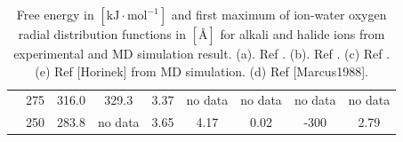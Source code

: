 \begin{table}[h]
\begin{centering}
\begin{tabular*}{1\linewidth}{@{\extracolsep{\fill}}ccccccccc}
\addlinespace[-0.33em]
{\scriptsize{}$\mathrm{Rb^{+}}$ } & {\scriptsize{}275} & {\scriptsize{}316.0} & {\scriptsize{}329.3} & {\scriptsize{}3.37} & {\scriptsize{}no data} & {\scriptsize{}no data} & {\scriptsize{}no data} & {\scriptsize{}no data}\tabularnewline
\addlinespace[-0.33em]
{\scriptsize{}$\mathrm{Cs^{+}}$ } & {\scriptsize{}250} & {\scriptsize{}283.8} & {\scriptsize{}no data} & {\scriptsize{}3.65} & {\scriptsize{}4.17} & {\scriptsize{}0.02} & {\scriptsize{}-300} & {\scriptsize{}2.79}\tabularnewline
\bottomrule
\end{tabular*}
\par\end{centering}
\caption[Free energy and first maximum of ion-water oxygen \acs{RDF} for alkali
and halide ions from experimental and \acs{MD} simulation result]{Free energy in $[\mathrm{kJ\cdot mol^{-1}}]$ and first maximum of
ion-water oxygen radial distribution functions in $[\textrm{Å}]$
for alkali and halide ions from experimental and \acs{MD} simulation
result. (a). Ref \citep{MARCUS1994111}. (b). Ref \citep{Noyes_1962}.
(c) Ref \citep{tissandier_protons_1998}. (e) Ref {[}Horinek{]} from
\acs{MD} simulation. (d) Ref {[}Marcus1988{]}.\label{tab:single-ions}}

\vspace{0.5cm}


\end{table}
